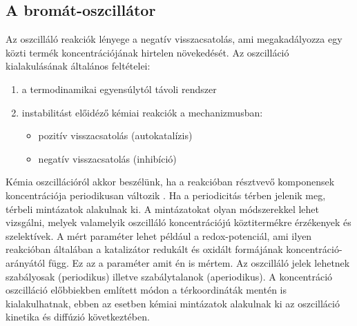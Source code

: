 \subsection{A bromát-oszcillátor} \label{bromatoszcillator}
Az oszcilláló reakciók lényege a negatív visszacsatolás, ami megakadályozza egy közti termék koncentrációjának hirtelen növekedését. Az oszcilláció kialakulásának általános feltételei:
\begin{enumerate}
\item a termodinamikai egyensúlytól távoli rendszer
\item instabilitást előidéző kémiai reakciók a mechanizmusban:
 \begin{itemize}
\item pozitív visszacsatolás (autokatalízis)
\item negatív visszacsatolás (inhibíció)
\end{itemize}
\end{enumerate}
Kémia oszcillációról akkor beszélünk, ha a reakcióban résztvevő komponensek koncentrációja periodikusan változik \cite{miklososzcillalo}. Ha a periodicitás térben jelenik meg, térbeli mintázatok alakulnak ki. A mintázatokat olyan módszerekkel lehet vizsgálni, melyek valamelyik oszcilláló koncentrációjú köztitermékre érzékenyek és szelektívek. A mért paraméter lehet például a redox-potenciál, ami ilyen reakcióban általában a katalizátor redukált és oxidált formájának koncentráció-arányától függ. Ez az a paraméter amit én is mértem.
Az oszcilláló jelek lehetnek szabályosak (periodikus) illetve szabálytalanok (aperiodikus). A koncentráció oszcilláció előbbiekben említett módon a térkoordináták mentén is kialakulhatnak, ebben az esetben kémiai mintázatok alakulnak ki az oszcilláció kinetika és diffúzió következtében.
